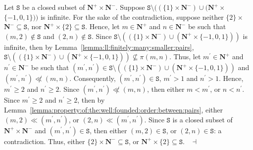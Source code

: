 \documentclass[draft]{article}
\newenvironment{proof}{{\bf Proof:}}{~$\dashv$\\}
\begin{document}
\begin{proof}
%
%
Let $\mathtt{S}$ be a closed subset of $\mathbf{N}^{+}{\times}\mathbf{N}^{-}$.
Suppose $\mathtt{S}{\setminus}((\{1\}{\times}\mathbf{N}^{-}){\cup}(\mathbf{N}^{+}{\times}
%
%
%
%
%
%
%
%
%
%
%
%
$\linebreak$
%
%
%
%
%
%
%
%
%
%
%
%
\{{-}1,0,1\}))$ is infinite.
For the sake of the contradiction, suppose neither $\{2\}{\times}
%
%
%
%
%
%
%
%
%
%
%
%
$\linebreak$
%
%
%
%
%
%
%
%
%
%
%
%
\mathbf{N}^{-}{\subseteq}\mathtt{S}$, nor $\mathbf{N}^{+}{\times}\{2\}{\subseteq}\mathtt{S}$.
Hence, let $m{\in}\mathbf{N}^{+}$ and $n{\in}\mathbf{N}^{-}$ be such that $(m,2){\not\in}\mathtt{S}$ and $(2,n){\not\in}\mathtt{S}$.
Since $\mathtt{S}{\setminus}((\{1\}{\times}\mathbf{N}^{-}){\cup}(\mathbf{N}^{+}{\times}\{{-}1,0,1\}))$ is infinite, then by
%
%
%
%
%
%
%
%
%
%
%
%
\linebreak
%
%
%
%
%
%
%
%
%
%
%
%
Lemma~\ref{lemma:ll:finitely:many:smaller:pairs}, $\mathtt{S}{\setminus}((\{1\}{\times}\mathbf{N}^{-}){\cup}(\mathbf{N}^{+}{\times}\{{-}1,0,1\})){\not\subseteq}\pi(m,n)$.
Thus, let $m^{\prime}{\in}\mathbf{N}^{+}$ and $n^{\prime}{\in}\mathbf{N}^{-}$ be such that $(m^{\prime},n^{\prime}){\in}\mathtt{S}{\setminus}((\{1\}{\times}\mathbf{N}^{-}){\cup}(\mathbf{N}^{+}{\times}\{{-}1,0,1\}))$ and $(m^{\prime},n^{\prime}){\not\ll}
%
%
%
%
%
%
%
%
%
%
%
%
$\linebreak$
%
%
%
%
%
%
%
%
%
%
%
%
(m,n)$.
Consequently, $(m^{\prime},n^{\prime}){\in}\mathtt{S}$, $m^{\prime}{>}1$ and $n^{\prime}{>}1$.
Hence, $m^{\prime}{\geq}2$ and $n^{\prime}{\geq}2$.
Since $(m^{\prime},n^{\prime}){\not\ll}(m,n)$, then either $m{<}m^{\prime}$, or $n{<}n^{\prime}$.
Since $m^{\prime}{\geq}2$ and $n^{\prime}{\geq}2$, then by Lemma~\ref{lemma:property:of:the:well:founded:order:between:pairs}, either $(m,2){\ll}(m^{\prime},n^{\prime})$, or $(2,n){\ll}(m^{\prime},n^{\prime})$.
Since $\mathtt{S}$ is a closed subset of $\mathbf{N}^{+}{\times}\mathbf{N}^{-}$ and $(m^{\prime},n^{\prime}){\in}\mathtt{S}$, then either $(m,2){\in}\mathtt{S}$, or $(2,n){\in}\mathtt{S}$: a contradiction.
Thus, either $\{2\}{\times}\mathbf{N}^{-}{\subseteq}\mathtt{S}$, or $\mathbf{N}^{+}{\times}\{2\}{\subseteq}\mathtt{S}$.
%
%
\medskip
%
%
\end{proof}
%
%
%
%
\end{document}
